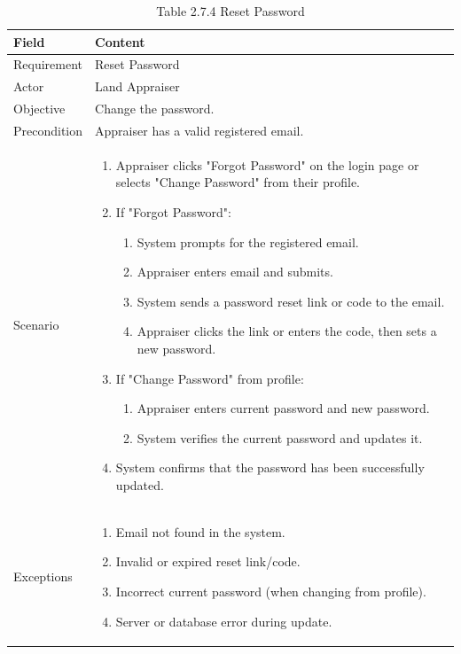 \documentclass[12pt,oneside]{report}
\begin{document}
\begin{table}[H]
\centering
\caption{Table 2.7.4 Reset Password}
\label{tab:req-reset-password}
\begin{tabularx}{\textwidth}{|p{3cm}|X|}
\hline
\textbf{Field} & \textbf{Content} \\ \hline

Requirement & Reset Password \\ \hline

Actor & Land Appraiser \\ \hline

Objective & Change the password. \\ \hline

Precondition & Appraiser has a valid registered email. \\ \hline

Scenario & 
\begin{minipage}[t]{0.75\textwidth}
\begin{enumerate}[leftmargin=*,label=\arabic*.]
\item Appraiser clicks "Forgot Password" on the login page or selects "Change Password" from their profile.
\item If "Forgot Password":
  \begin{enumerate}[label*=\arabic*.]
  \item System prompts for the registered email.
  \item Appraiser enters email and submits.
  \item System sends a password reset link or code to the email.
  \item Appraiser clicks the link or enters the code, then sets a new password.
  \end{enumerate}
\item If "Change Password" from profile:
  \begin{enumerate}[label*=\arabic*.]
  \item Appraiser enters current password and new password.
  \item System verifies the current password and updates it.
  \end{enumerate}
\item System confirms that the password has been successfully updated.
\end{enumerate}
\end{minipage} \\ \hline

Exceptions & 
\begin{minipage}[t]{0.75\textwidth}
\begin{enumerate}[leftmargin=*,label=\arabic*.]
\item Email not found in the system.
\item Invalid or expired reset link/code.
\item Incorrect current password (when changing from profile).
\item Server or database error during update.
\end{enumerate}
\end{minipage} \\ \hline
\end{tabularx}
\end{table}
\end{document}

